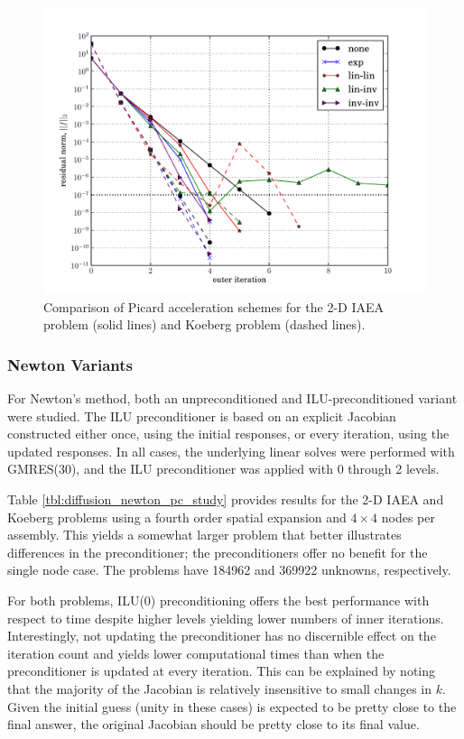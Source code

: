 \begin{figure}[ht]
    \centering
    \includegraphics[keepaspectratio, width = 3.5 in]
                    {diffusion_picard_acceleration}
    \caption{Comparison of Picard acceleration schemes for the 
             2-D IAEA problem (solid lines) and Koeberg 
             problem (dashed lines).  }
    \label{fig:diffusion_picard_acceleration}
\end{figure}

\subsubsection{Newton Variants}

For Newton's method, both an unpreconditioned 
and ILU-preconditioned variant were studied.  The ILU preconditioner 
is based on an explicit Jacobian constructed either once, using the 
initial responses, or every iteration, using the updated responses.  
In all cases, the underlying linear solves were performed with GMRES(30),
and the ILU preconditioner was applied with 0 through 2 levels.

Table \ref{tbl:diffusion_newton_pc_study} provides results for the 
2-D IAEA and Koeberg problems using a fourth order spatial 
expansion and $4\times 4$ nodes per assembly.  This yields a 
somewhat larger problem that better illustrates differences 
in the preconditioner; the preconditioners offer no benefit 
for the single node case.  The problems have 184962 and 
369922 unknowns, respectively.

For both problems, ILU(0) preconditioning offers the best performance
with respect to time despite higher levels yielding lower numbers of 
inner iterations.
Interestingly, not updating the preconditioner has no discernible effect 
on the iteration count and yields lower computational times than when 
the preconditioner is updated at every iteration.  This can be explained 
by noting that the majority of the Jacobian is relatively insensitive 
to small changes in $k$.  Given the initial guess (unity in these cases)
is expected to be pretty close to the final answer, the original Jacobian
should be pretty close to its final value.


